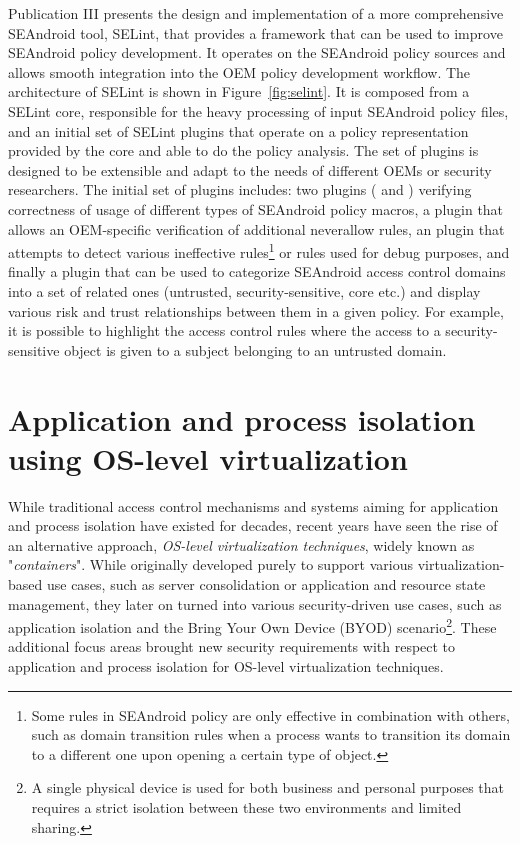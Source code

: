 Publication III presents the design and implementation of a more comprehensive SEAndroid tool, SELint, that provides a framework that can be used to improve SEAndroid policy development. It operates on the SEAndroid policy sources and allows smooth integration into the OEM policy development workflow. The architecture of SELint is shown in Figure~\ref{fig:selint}. It is composed from a SELint core, responsible for the heavy processing of input SEAndroid policy files, and an initial set of SELint plugins that operate on a policy representation provided by the core and able to do the policy analysis. The set of plugins is designed to be extensible and adapt to the needs of different OEMs or security researchers. The initial set of plugins includes: two plugins ( and ) verifying correctness of usage of different types of SEAndroid policy macros, a  plugin that allows an OEM-specific verification of additional neverallow rules, an  plugin that attempts to detect various ineffective rules\footnote{Some rules in SEAndroid policy are only effective in combination with others, such as domain transition rules when a process wants to transition its domain to a different one upon opening a certain type of object.} or rules used for debug purposes, and finally a  plugin that can be used to categorize SEAndroid access control domains into a set of related ones (untrusted, security-sensitive, core etc.) and display various risk and trust relationships between them in a given policy. For example, it is possible to highlight the access control rules where the access to a security-sensitive object is given to a subject belonging to an untrusted domain.


\section{Application and process isolation using OS-level virtualization}
\label{sec:os-virt}

While traditional access control mechanisms and systems aiming for application and process isolation have existed for decades, recent years have seen the rise of an alternative approach, \textit{OS-level virtualization techniques}, widely known as "\textit{containers}". While originally developed purely to support various virtualization-based use cases, such as server consolidation or application and resource state management, they later on turned into various security-driven use cases, such as application isolation and the Bring Your Own Device (BYOD) scenario\footnote{A single physical device is used for both business and personal purposes that requires a strict isolation between these two environments and limited sharing.}. These additional focus areas brought new security requirements with respect to application and process isolation for OS-level virtualization techniques.


